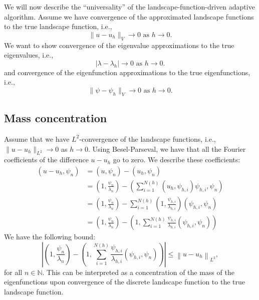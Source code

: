 We will now describe the ``universality'' of the landscape-function-driven adaptive algorithm.
Assume we have convergence of the approximated landscape functions to the true landscape function, i.e.,
\begin{equation}
    \label{eq:convergence}
    \lVert u - u_h \rVert_{V} \to 0 \text{ as } h \to 0.
\end{equation}
We want to show convergence of the eigenvalue approximations to the true eigenvalues, i.e.,
\begin{equation}
    \label{eq:eigenvalue_convergence}
    \lvert \lambda - \lambda_h \rvert \to 0 \text{ as } h \to 0.
\end{equation}
and convergence of the eigenfunction approximations to the true eigenfunctions, i.e.,
\begin{equation}
    \label{eq:eigenfunction_convergence}
    \lVert \psi - \psi_h \rVert_{V} \to 0 \text{ as } h \to 0.
\end{equation}


\subsection{Mass concentration}

Assume that we have \(L^2\)-convergence of the landscape functions, i.e., \(\lVert u - u_h \rVert_{L^2} \to 0\) as \(h \to 0\).
Using Besel-Parseval, we have that all the Fourier coefficients of the difference \(u - u_h\) go to zero.
We describe these coefficients:
\begin{align*}
    \label{eq:fourier}
    (u - u_h, \psi_n) & = (u, \psi_n) - (u_h, \psi_n)\\
    & = \left(1, \frac{\psi_n}{\lambda_n}\right) -
    \left(\sum_{i=1}^{N(h)} (u_h, \psi_{h, i}) \psi_{h, i}, \psi_n\right) \\
    & = \left(1, \frac{\psi_n}{\lambda_n}\right) - \sum_{i=1}^{N(h)}  \left(1, \frac{\psi_{h, i}}{\lambda_{h, i}} \right) (\psi_{h, i}, \psi_n) \\
    & = \left(1, \frac{\psi_n}{\lambda_n}\right) - \left(1, \sum_{i=1}^{N(h)} \frac{\psi_{h, i}}{\lambda_{h, i}} (\psi_{h, i}, \psi_n)\right)
\end{align*}
We have the following bound:
\begin{equation}
    \label{eq:fourier_bound}
    \left\lvert
    \left(1, \frac{\psi_n}{\lambda_n}\right) - \left(1, \sum_{i=1}^{N(h)} \frac{\psi_{h, i}}{\lambda_{h, i}} (\psi_{h, i}, \psi_n)\right)
    \right\rvert
\leq \left\lVert u - u_h \right\rVert_{L^2},
\end{equation}
for all \(n \in \mathbb{N}\).
This can be interpreted as a concentration of the mass of the eigenfunctions upon convergence of the discrete landscape function to the true landscape function.

